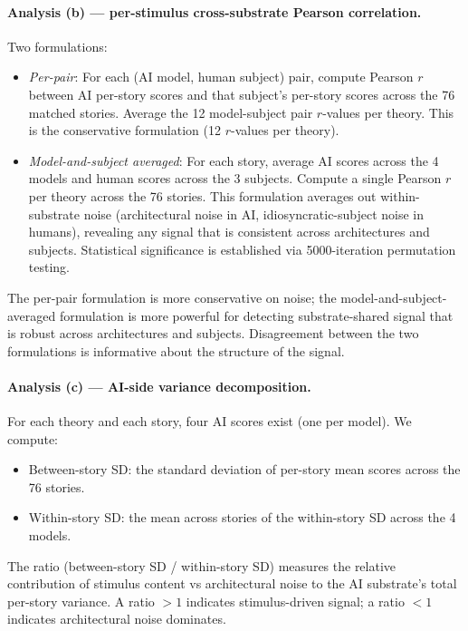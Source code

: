 \documentclass[11pt,a4paper]{article}
\begin{document}
\paragraph{Analysis (b) --- per-stimulus cross-substrate Pearson correlation.} Two formulations:

\begin{itemize}
  \item \emph{Per-pair}: For each (AI model, human subject) pair, compute Pearson $r$ between AI per-story scores and that subject's per-story scores across the 76 matched stories. Average the 12 model-subject pair $r$-values per theory. This is the conservative formulation (12 $r$-values per theory).
  \item \emph{Model-and-subject averaged}: For each story, average AI scores across the 4 models and human scores across the 3 subjects. Compute a single Pearson $r$ per theory across the 76 stories. This formulation averages out within-substrate noise (architectural noise in AI, idiosyncratic-subject noise in humans), revealing any signal that is consistent across architectures and subjects. Statistical significance is established via 5000-iteration permutation testing.
\end{itemize}

The per-pair formulation is more conservative on noise; the model-and-subject-averaged formulation is more powerful for detecting substrate-shared signal that is robust across architectures and subjects. Disagreement between the two formulations is informative about the structure of the signal.

\paragraph{Analysis (c) --- AI-side variance decomposition.} For each theory and each story, four AI scores exist (one per model). We compute:

\begin{itemize}
  \item Between-story SD: the standard deviation of per-story mean scores across the 76 stories.
  \item Within-story SD: the mean across stories of the within-story SD across the 4 models.
\end{itemize}

The ratio (between-story SD / within-story SD) measures the relative contribution of stimulus content vs architectural noise to the AI substrate's total per-story variance. A ratio $> 1$ indicates stimulus-driven signal; a ratio $< 1$ indicates architectural noise dominates.
\end{document}
